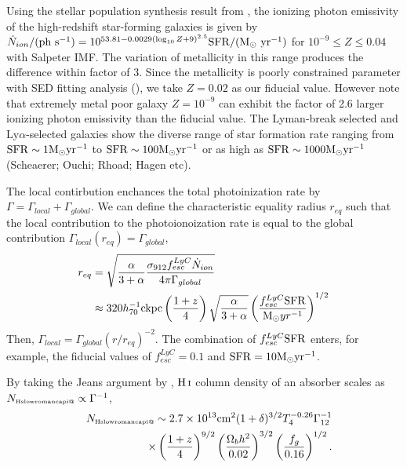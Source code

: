 \documentclass[useAMS,usenatbib,twocolumn]{mn2e}
\makeatletter
\newcommand{\HI}{{\rm H\,{\scriptstyle I}}}
\newcommand{\Rmnum}[1]{\expandafter\@slowromancap\romannumeral #1@}
\newcommand{\LyA}{\mbox{Ly}\alpha}
\newcommand{\NHI}{N_{\mbox{\tiny H\Rmnum{1}}}}
\makeatother
\begin{document}
Using the stellar population synthesis result from \cite{2003A&A...397..527S},
the ionizing photon emissivity of the high-redshift star-forming galaxies 
is given by $\dot{N}_{ion}/({\rm{ph~s^{-1}}})=10^{53.81-0.0029(\log_{10}Z+9)^{2.5}}
\rm{SFR/(M_\odot~yr^{-1})}$ for $10^{-9}\leq Z\leq0.04$ with Salpeter IMF.
The variation of metallicity in this range produces the difference within
factor of 3. Since the metallicity is poorly constrained parameter with 
SED fitting analysis (\citealt{2014A&A...563A..81D}), we take $Z=0.02$
as our fiducial value. However note that extremely metal poor galaxy 
$Z=10^{-9}$ can exhibit the factor of 2.6 larger ionizing photon emissivity
than the fiducial value. The Lyman-break selected and $\LyA$-selected 
galaxies show the diverse range of star formation rate ranging from 
$\rm SFR\sim 1 M_\odot yr^{-1}$ to $\rm SFR\sim 100 M_\odot yr^{-1}$ or as high
as $\rm SFR\sim 1000 M_\odot yr^{-1}$ (Scheaerer; Ouchi; Rhoad; Hagen etc).


The local contirbution enchances the total photoinization rate by 
$\Gamma=\Gamma_{local}+\Gamma_{global}$. We can define the characteristic 
equality radius $r_{eq}$ such that the local contribution to the 
photoionoization rate is equal to the global contribution 
$\Gamma_{local}(r_{eq})=\Gamma_{global}$,
\begin{align}
r_{eq}&=\sqrt{\frac{\alpha}{3+\alpha}
\frac{\sigma_{912}f_{esc}^{LyC}\dot{N}_{ion}}{4\pi\Gamma_{global}}} \nonumber \\
&\approx 320{h_{70}^{-1}\rm{ckpc}}\left(\frac{1+z}{4}\right)
\sqrt{\frac{\alpha}{3+\alpha}}
\left(\frac{f_{esc}^{LyC}{\rm{SFR}} }{{\rm{M_\odot}} yr^{-1}}\right)^{1/2}
\end{align}
Then, $\Gamma_{local}=\Gamma_{global}(r/r_{eq})^{-2}$. The combination of
$f_{esc}^{LyC}{\rm{SFR}}$ enters, for example, the fiducial values
of $f_{esc}^{LyC}=0.1$ and $\rm{SFR}=10{\rm{M_\odot}} yr^{-1}$.

By taking the Jeans argument by \cite{2001ApJ...559..507S}, 
$\HI$ column density of an absorber scales as $\NHI\propto \Gamma^{-1}$,
\begin{eqnarray}
&&\NHI\sim 2.7\times10^{13}{\rm{cm^2}}(1+\delta)^{3/2}T_4^{-0.26}\Gamma_{12}^{-1}
\nonumber \\ 
&&~~~~~~~~~~~~\times\left(\frac{1+z}{4}\right)^{9/2}
\left(\frac{\Omega_bh^2}{0.02}\right)^{3/2}\left(\frac{f_g}{0.16}\right)^{1/2}.
\end{eqnarray}
\end{document}
